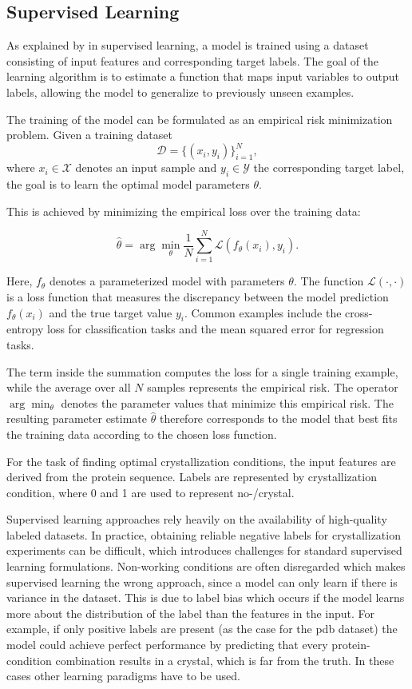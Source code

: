 \subsection{Supervised Learning}
As explained by \cite{Mohri2018} in supervised learning, a model is trained using a dataset consisting of input features and corresponding target labels. The goal of the learning algorithm is to estimate a function that maps input variables to output labels, allowing the model to generalize to previously unseen examples.

The training of the model can be formulated as an empirical risk minimization problem. 
Given a training dataset 
\[
\mathcal{D} = \{(x_i, y_i)\}_{i=1}^{N},
\]
where \(x_i \in \mathcal{X}\) denotes an input sample and \(y_i \in \mathcal{Y}\) the corresponding target label, the goal is to learn the optimal model parameters \(\theta\).

This is achieved by minimizing the empirical loss over the training data:

\[
\hat{\theta} = \arg\min_{\theta} \frac{1}{N}\sum_{i=1}^{N} \mathcal{L}(f_\theta(x_i), y_i).
\]

Here, \(f_\theta\) denotes a parameterized model with parameters \(\theta\). The function \(\mathcal{L}(\cdot,\cdot)\) is a loss function that measures the discrepancy between the model prediction \(f_\theta(x_i)\) and the true target value \(y_i\). Common examples include the cross-entropy loss for classification tasks and the mean squared error for regression tasks.

The term inside the summation computes the loss for a single training example, while the average over all \(N\) samples represents the empirical risk. The operator \(\arg\min_{\theta}\) denotes the parameter values that minimize this empirical risk. The resulting parameter estimate \(\hat{\theta}\) therefore corresponds to the model that best fits the training data according to the chosen loss function.

For the task of finding optimal crystallization conditions, the input features are derived from the protein sequence. Labels are represented by crystallization condition, where 0 and 1 are used to represent no-/crystal. 

Supervised learning approaches rely heavily on the availability of high-quality labeled datasets. In practice, obtaining reliable negative labels for crystallization experiments can be difficult, which introduces challenges for standard supervised learning formulations. Non-working conditions are often disregarded which makes supervised learning the wrong approach, since a model can only learn if there is variance in the dataset. This is due to label bias which occurs if the model learns more about the distribution of the label than the features in the input. For example, if only positive labels are present (as the case for the \gls{pdb} dataset) the model could achieve perfect performance by predicting that every protein-condition combination results in a crystal, which is far from the truth. In these cases other learning paradigms have to be used. 

